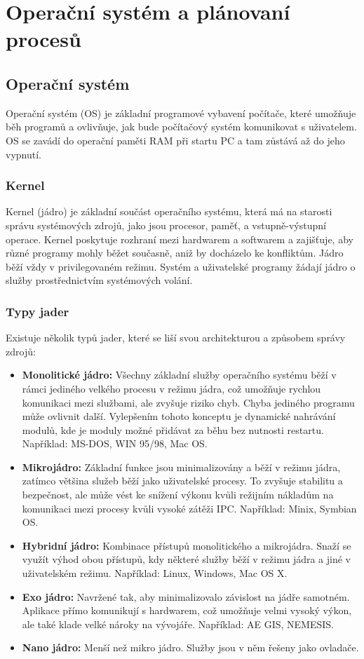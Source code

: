 \section{Operační systém a plánovaní procesů}
\subsection{Operační systém}
Operační systém (OS) je základní programové vybavení počítače, které umožňuje běh programů a ovlivňuje, jak bude počítačový systém komunikovat s uživatelem. OS se zavádí do operační paměti RAM při startu PC a tam zůstává až do jeho vypnutí.

\subsubsection{Kernel}
Kernel (jádro) je základní součást operačního systému, která má na starosti správu systémových zdrojů, jako jsou procesor, paměť, a vstupně-výstupní operace. Kernel poskytuje rozhraní mezi hardwarem a softwarem a zajišťuje, aby různé programy mohly běžet současně, aniž by docházelo ke konfliktům. Jádro běží vždy v privilegovaném režimu. Systém a uživatelské programy žádají jádro o služby prostřednictvím systémových volání.
\subsubsection{Typy jader}
Existuje několik typů jader, které se liší svou architekturou a způsobem správy zdrojů:
\begin{itemize}
\item \textbf{Monolitické jádro:} Všechny základní služby operačního systému běží v rámci jediného velkého procesu v režimu jádra, což umožňuje rychlou komunikaci mezi službami, ale zvyšuje riziko chyb. Chyba jediného programu může ovlivnit další. Vylepšením tohoto konceptu je dynamické nahrávání modulů, kde je moduly možné přidávat za běhu bez nutnosti restartu. Například: MS-DOS, WIN 95/98, Mac OS.
\item \textbf{Mikrojádro:} Základní funkce jsou minimalizovány a běží v režimu jádra, zatímco většina služeb běží jako uživatelské procesy. To zvyšuje stabilitu a bezpečnost, ale může vést ke snížení výkonu kvůli režijním nákladům na komunikaci mezi procesy kvůli vysoké zátěži IPC.
Například: Minix, Symbian OS.
\item \textbf{Hybridní jádro:} Kombinace přístupů monolitického a mikrojádra. Snaží se využít výhod obou přístupů, kdy některé služby běží v režimu jádra a jiné v uživatelském režimu. Například: Linux, Windows, Mac OS X.
\item \textbf{Exo jádro:} Navržené tak, aby minimalizovalo závislost na jádře samotném. Aplikace přímo komunikují s hardwarem, což umožňuje velmi vysoký výkon, ale také klade velké nároky na vývojáře. Například: AE GIS, NEMESIS.
\item \textbf{Nano jádro:} Menší než mikro jádro. Služby jsou v něm řešeny jako ovladače.
\end{itemize}

